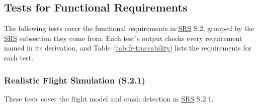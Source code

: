 \documentclass[12pt, titlepage]{article}
\begin{document}
\subsection{Tests for Functional Requirements}

The following tests cover the functional requirements in \hyperlink{abbr:SRS}{SRS} S.2, grouped by the \hyperlink{abbr:SRS}{SRS}
subsection they come from. Each test's output checks every requirement named in its
derivation, and Table~\ref{tab:fr-traceability} lists the requirements for each test.

\subsubsection{Realistic Flight Simulation (S.2.1)}

These tests cover the flight model and crash detection in \hyperlink{abbr:SRS}{SRS} S.2.1.
\end{document}
